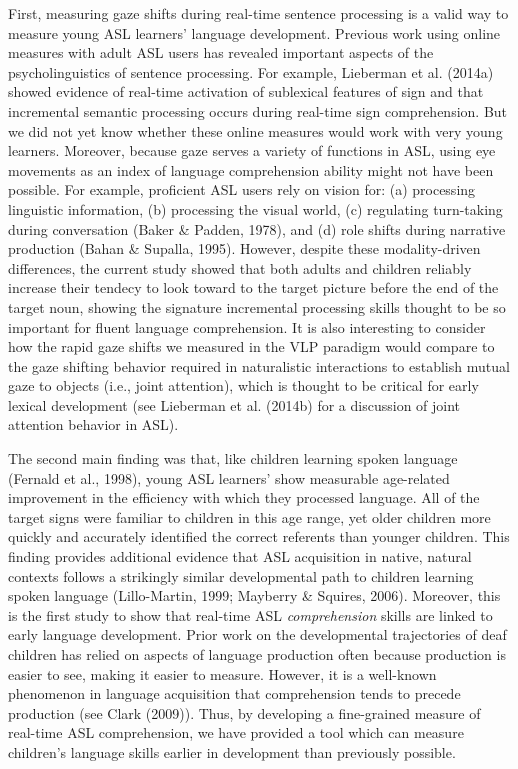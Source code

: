 \documentclass[12pt,]{article}
\begin{document}
First, measuring gaze shifts during real-time sentence processing is a
valid way to measure young ASL learners' language development. Previous
work using online measures with adult ASL users has revealed important
aspects of the psycholinguistics of sentence processing. For example,
Lieberman et al. (2014a) showed evidence of real-time activation of
sublexical features of sign and that incremental semantic processing
occurs during real-time sign comprehension. But we did not yet know
whether these online measures would work with very young learners.
Moreover, because gaze serves a variety of functions in ASL, using eye
movements as an index of language comprehension ability might not have
been possible. For example, proficient ASL users rely on vision for: (a)
processing linguistic information, (b) processing the visual world, (c)
regulating turn-taking during conversation (Baker \& Padden, 1978), and
(d) role shifts during narrative production (Bahan \& Supalla, 1995).
However, despite these modality-driven differences, the current study
showed that both adults and children reliably increase their tendecy to
look toward to the target picture before the end of the target noun,
showing the signature incremental processing skills thought to be so
important for fluent language comprehension. It is also interesting to
consider how the rapid gaze shifts we measured in the VLP paradigm would
compare to the gaze shifting behavior required in naturalistic
interactions to establish mutual gaze to objects (i.e., joint
attention), which is thought to be critical for early lexical
development (see Lieberman et al. (2014b) for a discussion of joint
attention behavior in ASL).

The second main finding was that, like children learning spoken language
(Fernald et al., 1998), young ASL learners' show measurable age-related
improvement in the efficiency with which they processed language. All of
the target signs were familiar to children in this age range, yet older
children more quickly and accurately identified the correct referents
than younger children. This finding provides additional evidence that
ASL acquisition in native, natural contexts follows a strikingly similar
developmental path to children learning spoken language (Lillo-Martin,
1999; Mayberry \& Squires, 2006). Moreover, this is the first study to
show that real-time ASL \emph{comprehension} skills are linked to early
language development. Prior work on the developmental trajectories of
deaf children has relied on aspects of language production often because
production is easier to see, making it easier to measure. However, it is
a well-known phenomenon in language acquisition that comprehension tends
to precede production (see Clark (2009)). Thus, by developing a
fine-grained measure of real-time ASL comprehension, we have provided a
tool which can measure children's language skills earlier in development
than previously possible.
\end{document}
